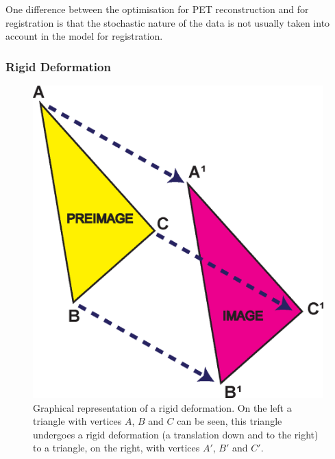            One difference between the optimisation for \gls{PET} reconstruction and for registration is that the stochastic nature of the data is not usually taken into account in the model for registration.
            
            \subsubsection{Rigid Deformation} \label{sec:rigid_deformation}
                \begin{figure}
                    \centering
                    
                    \includegraphics[width=1.0\linewidth]{figures/background_rd.png}
                    
                    \captionsetup{singlelinecheck=false, justification=raggedright}
                    \caption{Graphical representation of a rigid deformation. On the left a triangle with vertices $A$, $B$ and $C$ can be seen, this triangle undergoes a rigid deformation (a translation down and to the right) to a triangle, on the right, with vertices $A'$, $B'$ and $C'$.} \label{fig:rigid_transformations_rd}
                \end{figure}
                
